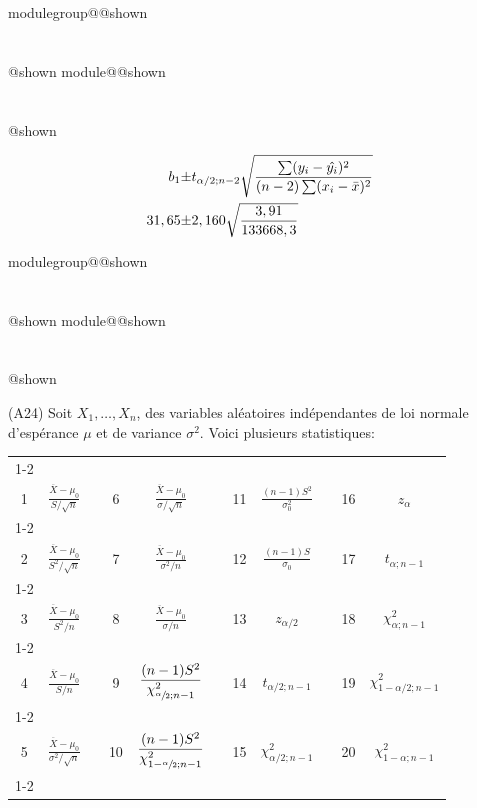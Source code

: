 \documentclass{Evaluation}
\makeatletter
\newcommand{\currentmodulekey}{}
\newcommand{\currentmoduletitle}{}
\newcommand{\currentgroupkey}{}
\newcommand{\currentgrouptitle}{}
\newcommand{\showmoduleifneeded}{%
  \ifx\currentgroupkey\empty\else
    \expandafter\ifx\csname modulegroup@\currentgroupkey @shown\endcsname\relax
      \section*{\currentgrouptitle}%
      \expandafter\gdef\csname modulegroup@\currentgroupkey @shown\endcsname{1}%
    \fi
  \fi
  \expandafter\ifx\csname module@\currentmodulekey @shown\endcsname\relax
    \section*{\currentmoduletitle}%
    \expandafter\gdef\csname module@\currentmodulekey @shown\endcsname{1}%
  \fi
}
\newenvironment{H23}{\showmoduleifneeded}{}
\newenvironment{A24}{\showmoduleifneeded}{}
\makeatother
\begin{document}
\begin{questions}
\begin{H23}
\begin{align*}
    b_1\pm& t_{\alpha/2;n-2}\sqrt{\frac{\sum(y_i-\hat{y_i})^2}{(n-2)\sum(x_i-\Bar{x})^2}}\\
    31,65 \pm& 2,160 \sqrt{\frac{3,91}{133668,3}}

\end{align*}
\end{H23}

\begin{A24}
\question
(A24) 
Soit $X_1,\hdots, X_{n}$, des variables aléatoires indépendantes de loi normale d'espérance $\mu$ et de variance $\sigma^2$. Voici plusieurs statistiques:
\begin{center}
    
\begin{tabular}{|c|c|c|c|c|c|c|c|c|c|c|}
\cline{1-2}\cline{4-5}\cline{7-8}\cline{10-11}&&&&&&&&&&\\[-3mm]

1 
& $\displaystyle \frac{\overline{X}-\mu_0}{S/\sqrt{n}}$
&
& 6 
& $\displaystyle \frac{\overline{X}-\mu_0}{\sigma/\sqrt{n}}$
&
&11
& $\displaystyle \frac{ (n-1)S^2}{ \sigma_0^2}$
&
&16
& $z_{\alpha}$
\\[4mm]

\cline{1-2}\cline{4-5}\cline{7-8}\cline{10-11}&&&&&&&&&&\\[-3mm]
2 
& $\displaystyle \frac{\overline{X}-\mu_0}{S^2/\sqrt{n}}$
&  
& 7 
& $\displaystyle \frac{\overline{X}-\mu_0}{\sigma^2/n}$
&
&12
& $\displaystyle  \frac{ (n-1)S}{\sigma_0}$
&
&17
& $t_{\alpha;n-1}$
\\[4mm]
\cline{1-2}\cline{4-5}\cline{7-8}\cline{10-11}&&&&&&&&&&\\[-3mm]
3 
& $\displaystyle \frac{\overline{X}-\mu_0}{S^2/n}$
&  
& 8 
& $\displaystyle \frac{\overline{X}-\mu_0}{\sigma/n}$
&
&13
& $z_{\alpha/2}$
&
&18
& $\chi^2_{\alpha;n-1}$
\\[4mm]
\cline{1-2}\cline{4-5}\cline{7-8}\cline{10-11}&&&&&&&&&&\\[-3mm]
4 
& $\displaystyle \frac{\overline{X}-\mu_0}{S/n}$
&  
& 9 
& $\displaystyle\frac{ (n-1)S^2}{ \chi_{\sfrac{\alpha}{2};n-1}^2}$
&
&14
& $t_{\alpha/2;n-1}$
&
&19
& $\chi^2_{1-\alpha/2;n-1}$
\\[4mm]
\cline{1-2}\cline{4-5}\cline{7-8}\cline{10-11}&&&&&&&&&&\\[-3mm]
5 
& $\displaystyle \frac{\overline{X}-\mu_0}{\sigma^2/\sqrt{n}}$
&  
& 10 
& $\displaystyle\frac{ (n-1)S^2}{ \chi_{1-\sfrac{\alpha}{2};n-1}^2}$
&
&15
& $\chi^2_{\alpha/2;n-1}$
&
&20
& $\chi^2_{1-\alpha;n-1}$
\\[4mm]
\cline{1-2}\cline{4-5}\cline{7-8}\cline{10-11}
\end{tabular}


\end{center}
\end{A24}
\end{questions}
\end{document}
